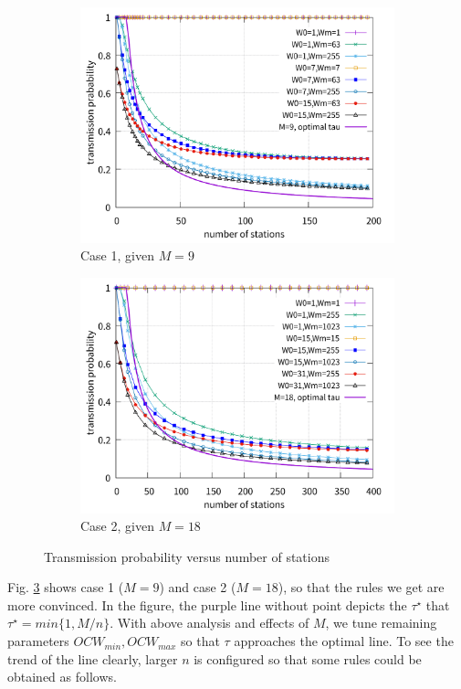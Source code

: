 \documentclass[journal]{IEEEtran}
\begin{document}
\begin{figure}[!t]
\centering
\begin{subfigure}{0.5\textwidth}
\includegraphics[scale=.38]{./figure/Section_perf_eval/tau/n_tau_perf_M9_x200.pdf}
\caption{Case 1, given $M=9$}
\label{fig_tau_n_M9}
\end{subfigure}
\begin{subfigure}{0.5\textwidth}
\includegraphics[scale=.38]{./figure/Section_perf_eval/tau/n_tau_perf_M18_x400.pdf}
\caption{Case 2, given $M=18$}
\label{fig_tau_n_M18}
\end{subfigure}
\caption{Transmission probability versus number of stations}
\label{fig_tau_n}
\end{figure}
Fig. \ref{fig_tau_n} shows case 1 ($M=9$) and case 2 ($M=18$), so that the rules we get are more convinced.
In the figure, the purple line without point depicts the $\tau^\star$ that $\tau^\star = min\lbrace 1, M/n \rbrace$.
With above analysis and effects of $M$, we tune remaining parameters $OCW_{min}, OCW_{max}$ so that $\tau$ approaches the optimal line. 
To see the trend of the line clearly, larger $n$ is configured so that some rules could be obtained as follows.
\end{document}
